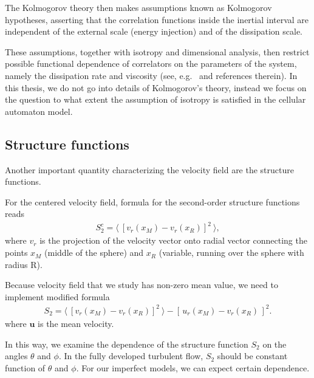 The Kolmogorov theory then makes assumptions known as Kolmogorov hypotheses, asserting that the correlation functions inside the inertial interval are independent of the external scale (energy injection) and of the dissipation scale.

These assumptions, together with isotropy and dimensional analysis, then restrict possible functional dependence of correlators on the parameters of the system, namely the dissipation rate and viscosity (see, e.g.\ \cite{scholtz} and references therein).  In this thesis, we do not go into details of Kolmogorov's theory, instead we focus on the question to what extent the assumption of isotropy is satisfied in the cellular automaton model.


\subsection{Structure functions}
Another important quantity characterizing the velocity field are the structure functions. 

For the centered velocity field, formula for the second-order structure functions reads
\begin{align}
S_2^c = \langle~ [v_r(x_M) - v_r(x_R)]^2 ~\rangle,
\end{align}
where $v_r$ is the projection of the velocity vector onto radial vector connecting the points $x_M$ (middle of the sphere) and $x_R$ (variable, running over the sphere with radius R). 

Because velocity field that we study has non-zero mean value, we need to implement modified formula
\begin{align} \label{str2}
S_2 = \langle~ [v_r(x_M) - v_r(x_R)]^2 ~\rangle - [ \, u_r(x_M)  - v_r(x_R) \,]^2.
\end{align}
where $\bm{u}$ is the mean velocity.

In this way, we examine the dependence of the structure function $S_2$ on the angles $\theta$ and $\phi$. 
In the fully developed turbulent flow, $S_2$ should be constant function of $\theta$ and $\phi$.
For our imperfect models, we can expect certain dependence.


